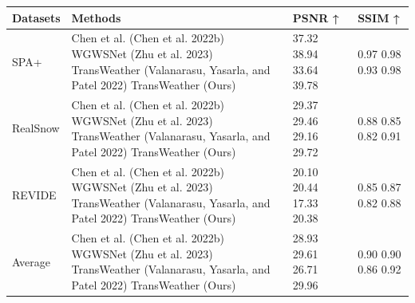 \begin{tabular}{llll}
\toprule
Datasets & Methods & PSNR ↑ & SSIM ↑ \\
\midrule
SPA+ & Chen et al. (Chen et al. 2022b) WGWSNet (Zhu et al. 2023) TransWeather (Valanarasu, Yasarla, and Patel 2022) TransWeather (Ours) & 37.32 38.94 33.64 39.78 & 0.97 0.98 0.93 0.98 \\
RealSnow & Chen et al. (Chen et al. 2022b) WGWSNet (Zhu et al. 2023) TransWeather (Valanarasu, Yasarla, and Patel 2022) TransWeather (Ours) & 29.37 29.46 29.16 29.72 & 0.88 0.85 0.82 0.91 \\
REVIDE & Chen et al. (Chen et al. 2022b) WGWSNet (Zhu et al. 2023) TransWeather (Valanarasu, Yasarla, and Patel 2022) TransWeather (Ours) & 20.10 20.44 17.33 20.38 & 0.85 0.87 0.82 0.88 \\
Average & Chen et al. (Chen et al. 2022b) WGWSNet (Zhu et al. 2023) TransWeather (Valanarasu, Yasarla, and Patel 2022) TransWeather (Ours) & 28.93 29.61 26.71 29.96 & 0.90 0.90 0.86 0.92 \\
\bottomrule
\end{tabular}
